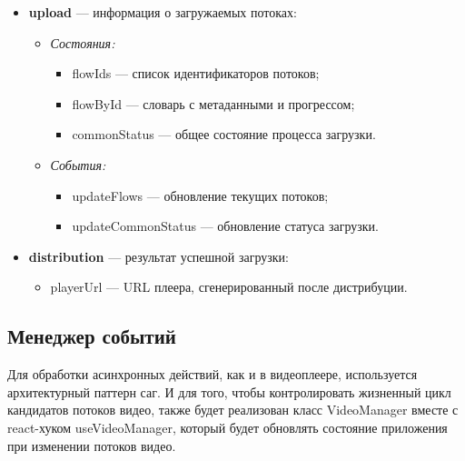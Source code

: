 \begin{itemize}[label=$\bullet$]
		\item \textbf{upload} — информация о загружаемых потоках:
		\begin{itemize}[label=$\circ$]
			\item \textit{Состояния:}
			\begin{itemize}[label=--]
				\item flowIds — список идентификаторов потоков;
				\item flowById — словарь с метаданными и прогрессом;
				\item commonStatus — общее состояние процесса загрузки.
			\end{itemize}
			\item \textit{События:}
			\begin{itemize}[label=--]
				\item updateFlows — обновление текущих потоков;
				\item updateCommonStatus — обновление статуса загрузки.
			\end{itemize}
		\end{itemize}
		
		\item \textbf{distribution} — результат успешной загрузки:
		\begin{itemize}[label=$\circ$]
			\item playerUrl — URL плеера, сгенерированный после дистрибуции.
		\end{itemize}
	\end{itemize}

	\subsection{Менеджер событий}
	
	Для обработки асинхронных действий, как и в видеоплеере, используется архитектурный паттерн саг. И для того, чтобы контролировать жизненный цикл кандидатов потоков видео, также будет реализован класс VideoManager вместе с react-хуком useVideoManager, который будет обновлять состояние приложения при изменении потоков видео.

